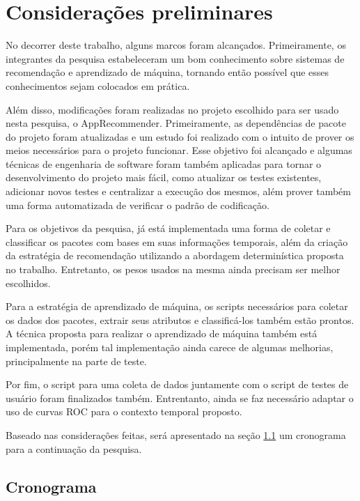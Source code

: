 \chapter[Considerações preliminares]{Considerações preliminares}

No decorrer deste trabalho, alguns marcos foram alcançados. Primeiramente, os
integrantes da pesquisa estabeleceram um bom conhecimento sobre sistemas de
recomendação e aprendizado de máquina, tornando então possível que esses
conhecimentos sejam colocados em prática.

Além disso, modificações foram realizadas no projeto escolhido para ser usado
nesta pesquisa, o AppRecommender. Primeiramente, as dependências de pacote do
projeto foram atualizadas e um estudo foi realizado com o intuito de prover os
meios necessários para o projeto funcionar. Esse objetivo foi alcançado e
algumas técnicas de engenharia de software foram também aplicadas para tornar o
desenvolvimento do projeto mais fácil, como atualizar os testes existentes, adicionar novos testes
e centralizar a execução dos mesmos, além prover também uma forma automatizada de
verificar o padrão de codificação.

Para os objetivos da pesquisa, já está implementada uma forma de coletar e
classificar os pacotes com bases em suas informações temporais, além da criação
da estratégia de recomendação utilizando a abordagem determinística proposta no
trabalho. Entretanto, os pesos usados na mesma ainda precisam ser melhor escolhidos.

Para a estratégia de aprendizado de máquina, os scripts necessários para coletar
os dados dos pacotes, extrair seus atributos e classificá-los também estão
prontos. A técnica proposta para realizar o aprendizado de máquina também está
implementada, porém tal implementação ainda carece de algumas melhorias,
principalmente na parte de teste.

Por fim, o script para uma coleta de dados juntamente com o script de testes de
usuário foram finalizados também. Entrentanto, ainda se faz necessário adaptar o
uso de curvas ROC para o contexto temporal proposto.

Baseado nas considerações feitas, será apresentado na seção \ref{sec:cronagrama} um cronograma
para a continuação da pesquisa.

\section{Cronograma} \label{sec:cronagrama}

